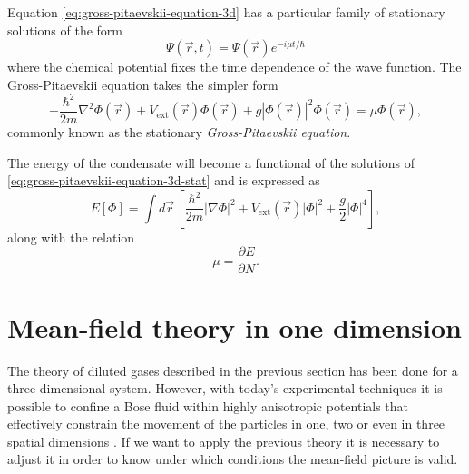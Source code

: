 Equation \eqref{eq:gross-pitaevskii-equation-3d} has a particular family of stationary solutions of the
form
%
\begin{equation}
    \Psi(\vec r, t) = \Psi(\vec r) e^{-i\mu t /\hbar}
\end{equation}
%
where the chemical potential fixes the time dependence of the wave function. The Gross-Pitaevskii equation takes the
simpler form
%
\begin{equation}
    \label{eq:gross-pitaevskii-equation-3d-stat}
    -\frac{\hbar^2}{2m} \nabla^2 \Phi(\vec r) +
    V_\mathrm{ext}(\vec r) \Phi(\vec r) +
    g \left| \Phi(\vec r) \right|^2 \Phi(\vec r) = \mu \Phi(\vec r),
\end{equation}
%
commonly known as the stationary \textit{Gross-Pitaevskii equation}.

The energy of the condensate will become a functional of the solutions of \eqref{eq:gross-pitaevskii-equation-3d-stat}
and is expressed as
%
\begin{equation}
    \label{eq:gross-pitaevskii-energy}
    E[\Phi] = \int d\vec r \, \left[
    \frac{\hbar^2}{2m} |\nabla \Phi|^2 + V_\mathrm{ext}(\vec r) |\Phi|^2 +
    \frac{g}{2} |\Phi|^4
    \right],
\end{equation}
%
along with the relation
%
\begin{equation}
    \label{eq:gross-pitaevskii-energy-chemical-potential}
    \mu = \frac{\partial E}{\partial N}.
\end{equation}



\section{Mean-field theory in one dimension}
\label{sec:mean-field-theory-in-one-dimension}

The theory of diluted gases described in the previous section has been done for a three-dimensional
system. However, with today's experimental techniques it is possible to confine a Bose fluid within highly
anisotropic potentials that effectively constrain the movement of the particles in one, two or even in three spatial
dimensions \cite{bib:a-gorlitz-phys-rev-lett.87.130402, bib:paredes-bloch-et-al-nature.419.2014}. If we want to apply
the previous theory it is necessary to adjust it in order to know under which conditions the mean-field picture is
valid.

